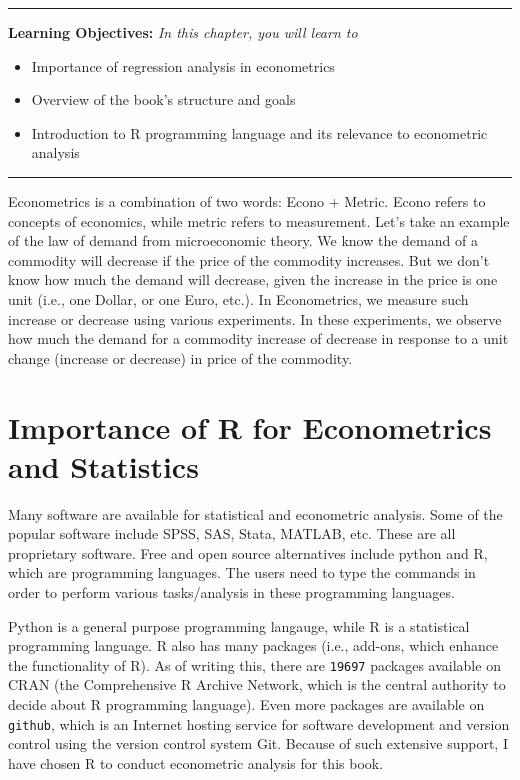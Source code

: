 \documentclass[
  letterpaper,
  paper =a4,
  twoside,
  openright,
  headsepline,
  footsepline,
  listof = totocnumbered,
  chapterprefix = true,
  firstiscover,
  parskip = full*]{scrbook}
\providecommand{\abstractname}{Learning Objectives} %
\newenvironment{objectives}[1]{%
	\hrule
	\vspace{5pt}
	\small\textbf{\abstractname: } 
	\newline
	\vspace{0.1cm}
	\small\emph{#1} %
	\itshape %
}{%
	\vspace{5pt}
	\hrule
	\vspace{0.6cm}
}
\begin{document}
\begin{objectives}{In this chapter, you will learn to}
\begin{itemize}

\item{Importance of regression analysis in econometrics}

\item{Overview of the book's structure and goals}

\item{Introduction to R programming language and its relevance to econometric analysis}

\end{itemize}

\end{objectives}

Econometrics is a combination of two words: Econo + Metric. Econo refers
to concepts of economics, while metric refers to measurement. Let's take
an example of the law of demand from microeconomic theory. We know the
demand of a commodity will decrease if the price of the commodity
increases. But we don't know how much the demand will decrease, given
the increase in the price is one unit (i.e., one Dollar, or one Euro,
etc.). In Econometrics, we measure such increase or decrease using
various experiments. In these experiments, we observe how much the
demand for a commodity increase of decrease in response to a unit change
(increase or decrease) in price of the commodity.

\section{Importance of R for Econometrics and
Statistics}\label{importance-of-r-for-econometrics-and-statistics}

Many software are available for statistical and econometric analysis.
Some of the popular software include SPSS, SAS, Stata, MATLAB, etc.
These are all proprietary software. Free and open source alternatives
include python and R, which are programming languages. The users need to
type the commands in order to perform various tasks/analysis in these
programming languages.

Python is a general purpose programming langauge, while R is a
statistical programming language. R also has many packages (i.e.,
add-ons, which enhance the functionality of R). As of writing this,
there are \texttt{19697} packages available on CRAN (the Comprehensive R
Archive Network, which is the central authority to decide about R
programming language). Even more packages are available on
\texttt{github}, which is an Internet hosting service for software
development and version control using the version control system Git.
Because of such extensive support, I have chosen R to conduct
econometric analysis for this book.
\end{document}
